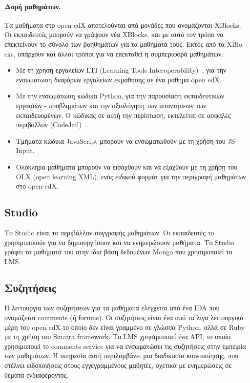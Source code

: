 \documentclass[12pt]{report}
\begin{document}
 \paragraph{Δομή μαθημάτων.} Τα μαθήματα στο \textlatin{open edX} αποτελούνται από μονάδες που ονομάζονται \textlatin{XBlocks}. Οι εκπαιδευτές μπορούν να γράψουν νέα \textlatin{XBlocks}, και με αυτό τον τρόπο να επεκτείνουν το σύνολο των βοηθημάτων για τα μαθήματά τους. Εκτός από τα \textlatin{XBlocks}, υπάρχουν και άλλοι τρόποι για να επεκταθεί η συμπεριφορά μαθημάτων:
\begin{itemize}
  \item Με τη χρήση εργαλείων \textlatin{LTI (Learning Tools Interoperability)}~\cite{lti}, για την ενσωματωση διαφόρων εργαλείων εκμάθησης σε ένα μάθημα \textlatin{open edX}.
  \item Με την ενσωμάτωση κώδικα \textlatin{Python}, για την παρουσίαση εκπαιδευτικών εργασιών - προβλημάτων και την αξιολόγηση των απαντήσεων των εκπαιδευομένων. Ο κώδικας σε αυτή την περίπτωση, εκτελείται σε ασφαλές περιβάλλον (\textlatin{CodeJail})~\cite{edx_arch}.
  \item Τμήματα κώδικα \textlatin{JavaScript} μπορούν να ενσωματωθούν με τη χρήση του \textlatin{JS Input}.
  \item Ολόκληρα μαθήματα μπορούν να εισαχθούν και να εξαχθούν με τη χρήση του \textlatin{OLX (open learning XML)}, ενός ειδικού φορμάτ για την περιγραφή μαθημάτων στο \textlatin{open-edX}.
\end{itemize}

\subsection{\textlatin{Studio}}
Το Studio είναι το περιβάλλον συγγραφής μαθημάτων. Οι εκπαιδευτές το χρησιμοποιούν για να δημιουργήσουν και να ενημερώσουν μαθήματα. Το \textlatin{Studio} γράφει τα μαθήματά του στην ίδια βάση δεδομένων \textlatin{Mongo} που χρησιμοποιεί το \textlatin{LMS}.

\subsection{Συζητήσεις}
H λειτουργια των συζητήσεων για τα μαθήματα ελέγχεται από ένα \textlatin{IDA} που ονομάζεται \textlatin{comments} (ή \textlatin{forums}). Οι συζητήσεις είναι ένα από τα λίγα λειτουργικά μέρη του \textlatin{open edX} το οποίο δεν είναι γραμμένο σε γλώσσα \textlatin{Python}, αλλά σε \textlatin{Ruby} με τη χρήση του \textlatin{Sinatra framework}. Το \textlatin{LMS} χρησιμοποιεί ένα \textlatin{API}, το οποίο χρησιμοποιεί το \textlatin{comments service} για να ενσωματώσει τις συζητήσεις στην εμπειρία των μαθημάτων. Η υπηρεσία αυτή περιλαμβάνει μια διαδικασία κοινοποίησης, που στέλνει ειδοποιήσεις στους εγγεγραμμένους μαθητές, σχετικά με ενημερώσεις σε θέματα ενδιαφέροντος.
\end{document}
